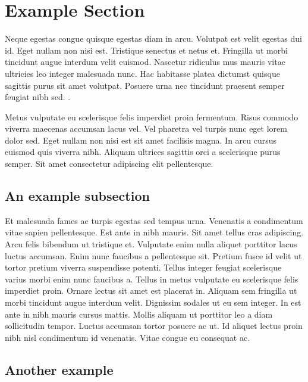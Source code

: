 \section{Example Section}

Neque egestas congue quisque egestas diam in arcu. Volutpat est velit egestas
dui id. Eget nullam non nisi est. Tristique senectus et netus et. Fringilla ut
morbi tincidunt augue interdum velit euismod. Nascetur ridiculus mus mauris
vitae ultricies leo integer malesuada nunc. Hac habitasse platea dictumst
quisque sagittis purus sit amet volutpat. Posuere urna nec tincidunt praesent
semper feugiat nibh sed. \autocite{Einstein1935}.

Metus vulputate eu scelerisque felis imperdiet proin fermentum. Risus commodo
viverra maecenas accumsan lacus vel. Vel pharetra vel turpis nunc eget lorem
dolor sed. Eget nullam non nisi est sit amet facilisis magna. In arcu cursus
euismod quis viverra nibh. Aliquam ultrices sagittis orci a scelerisque purus
semper. Sit amet consectetur adipiscing elit pellentesque.

\subsection{An example subsection}

Et malesuada fames ac turpis egestas sed tempus urna. Venenatis a condimentum
vitae sapien pellentesque. Est ante in nibh mauris. Sit amet tellus cras
adipiscing. Arcu felis bibendum ut tristique et. Vulputate enim nulla aliquet
porttitor lacus luctus accumsan. Enim nunc faucibus a pellentesque sit. Pretium
fusce id velit ut tortor pretium viverra suspendisse potenti. Tellus integer
feugiat scelerisque varius morbi enim nunc faucibus a. Tellus in metus
vulputate eu scelerisque felis imperdiet proin. \autocite{OramWilson2011}
Ornare lectus sit amet est placerat in. Aliquam sem fringilla ut morbi
tincidunt augue interdum velit.  Dignissim sodales ut eu sem integer. In est
ante in nibh mauris cursus mattis.  Mollis aliquam ut porttitor leo a diam
sollicitudin tempor. Luctus accumsan tortor posuere ac ut. Id aliquet lectus
proin nibh nisl condimentum id venenatis. Vitae congue eu consequat ac.

\subsection{Another example}

